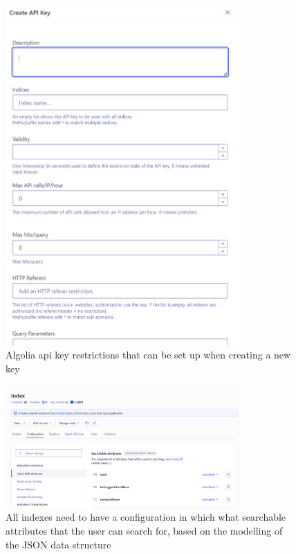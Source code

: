 \begin{figure}[htbp]
      \centering
      \includegraphics[width=0.8\textwidth]{Figures/Algolia API Key restrictions.png}
      \caption{Algolia \acrshort{api} key restrictions that can be set up when creating a new key}
\end{figure}

\begin{figure}[htbp]
      \centering
      \includegraphics[width=0.8\textwidth]{Figures/Algolia Configuration.png}
      \caption{All indexes need to have a configuration in which what searchable attributes that the user can search for, based on the
            modelling of the JSON data structure}

\end{figure}

